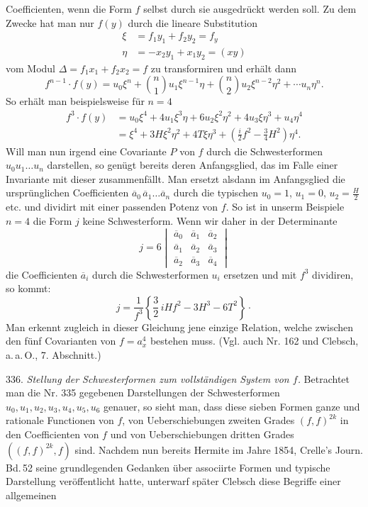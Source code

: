 \documentclass[11pt]{article}
\providecommand{\weberpage}[1]{}
\let\Delta\varDelta
\begin{document}
\weberpage{358}
Coefficienten, wenn die Form $f$ selbst durch sie ausgedrückt werden
soll. Zu dem Zwecke hat man nur $f(y)$ durch die lineare Substitution
\[
\begin{aligned}
\xi &= f_1y_1+f_2y_2 = f_y\\
\eta &= -x_2y_1+x_1y_2 = (xy)
\end{aligned}
\]
vom Modul $\Delta = f_1x_1+f_2x_2=f$ zu transformiren und erhält dann
\[
f^{n-1}\cdot f(y) = u_0\xi^n+\binom{n}{1}u_1\xi^{n-1}\eta+\binom{n}{2}u_2\xi^{n-2}\eta^2+\cdots u_n\eta^n.
\]
So erhält man beispielsweise für $n=4$
\[
\begin{aligned}
f^3\cdot f(y) &= u_0\xi^4+4u_1\xi^3\eta+6u_2\xi^2\eta^2+4u_3\xi\eta^3+u_4\eta^4\\
&= \xi^4+3H\xi^2\eta^2+4T\xi\eta^3+\left(\frac{i}{2}f^2-\frac{3}{4}H^2\right)\eta^4.
\end{aligned}
\]
Will man nun irgend eine Covariante $P$ von $f$ durch die
Schwesterformen $u_0u_1\dots u_n$ darstellen, so genügt bereits deren
Anfangsglied, das im Falle einer Invariante mit dieser zusammenfällt.
Man ersetzt alsdann im Anfangsglied die ursprünglichen Coefficienten
$\overline{a}_0\,\overline{a}_1\dots\overline{a}_n$ durch die typischen $u_0=1$, $u_1=0$,
$u_2=\frac{H}{2}$ etc. und dividirt mit einer passenden Potenz von $f$.
So ist in unserm Beispiele $n=4$ die Form $j$ keine Schwesterform.
Wenn wir daher in der Determinante
\[
j = 6\begin{vmatrix} \overline{a}_0 & \overline{a}_1 & \overline{a}_2 \\ \overline{a}_1 & \overline{a}_2 & \overline{a}_3 \\ \overline{a}_2 & \overline{a}_3 & \overline{a}_4 \end{vmatrix}
\]
die Coefficienten $\overline{a}_i$ durch die Schwesterformen $u_i$ ersetzen und
mit $f^3$ dividiren, so kommt:
\[
j = \frac{1}{f^3}\left\{\frac{3}{2}\,iHf^2 - 3H^3 - 6T^2\right\}\cdot
\]
Man erkennt zugleich in dieser Gleichung jene einzige Relation, welche
zwischen den fünf Covarianten von $f=a_x^4$ bestehen muss. (Vgl. auch
Nr. 162 und Clebsch, a.\,a.\,O., 7. Abschnitt.)

336. \textit{Stellung der Schwesterformen zum vollständigen System von $f$.}
Betrachtet man die Nr. 335 gegebenen Darstellungen der Schwesterformen
$u_0, u_1, u_2, u_3, u_4, u_5, u_6$ genauer, so sieht man, dass diese sieben
Formen ganze und rationale Functionen von $f$, von Ueberschiebungen
zweiten Grades $(f,f)^{2k}$ in den Coefficienten von $f$ und von
Ueberschiebungen dritten Grades $((f,f)^{2k},f)$ sind. Nachdem nun bereits
Hermite im Jahre 1854, Crelle's Journ. Bd.\,52 seine grundlegenden
Gedanken über associirte Formen und typische Darstellung
veröffentlicht hatte, unterwarf später Clebsch diese Begriffe einer
allgemeinen
\end{document}
